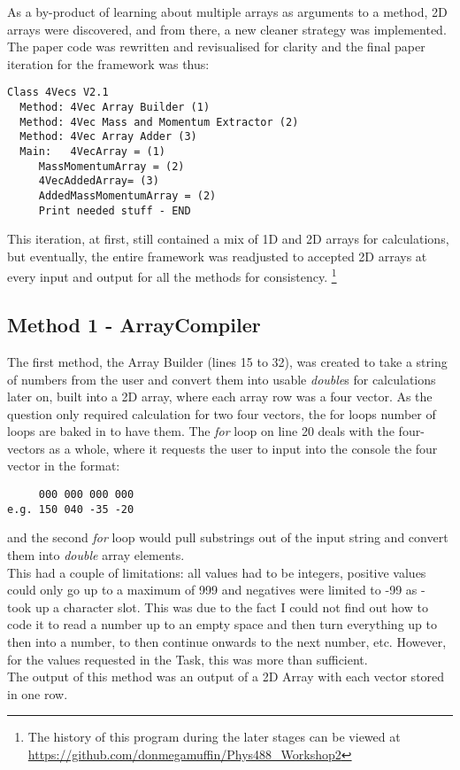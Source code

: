 \documentclass{article}
\begin{document}
\begin{multicols}{2}
		As a by-product of learning about multiple arrays as arguments to a method, 2D arrays were discovered, and from there, a new cleaner strategy was implemented. The paper code was rewritten and revisualised for clarity and the final paper iteration for the framework was thus:
		\begin{lstlisting}
Class 4Vecs V2.1
  Method: 4Vec Array Builder (1)
  Method: 4Vec Mass and Momentum Extractor (2)
  Method: 4Vec Array Adder (3)
  Main:   4VecArray = (1)
     MassMomentumArray = (2)
     4VecAddedArray= (3)
     AddedMassMomentumArray = (2)
     Print needed stuff - END
		\end{lstlisting}
		 This iteration, at first, still contained a mix of 1D and 2D arrays for calculations, but eventually, the entire framework was readjusted to accepted 2D arrays at every input and output for all the methods for consistency. \footnote{The history of this program during the later stages can be viewed at  \url{https://github.com/donmegamuffin/Phys488_Workshop2}}   %
			\subsection{Method 1 - ArrayCompiler}
			The first method, the Array Builder (lines 15 to 32), was created to take a string of numbers from the user and convert them into usable \textit{double}s for calculations later on, built into a 2D array, where each array row was a four vector. As the question only required calculation for two four vectors, the for loops number of loops are baked in to have them. The \textit{for} loop on line 20 deals with the four-vectors as a whole, where it requests the user to input into the console the four vector in the format:
			\begin{lstlisting}
	 000 000 000 000
e.g. 150 040 -35 -20
			\end{lstlisting}
			and the second \textit{for} loop would pull substrings out of the input string and convert them into \textit{double} array elements. \\ \indent This had a couple of limitations: all values had to be integers, positive values could only go up to a maximum of 999 and negatives were limited to -99 as - took up a character slot. This was due to the fact I could not find out how to code it to read a number up to an empty space and then turn everything up to then into a number, to then continue onwards to the next number, etc. However, for the values requested in the Task, this was more than sufficient. \\ \indent The output of this method was an output of a 2D Array with each vector stored in one row.

\end{multicols}
\end{document}
